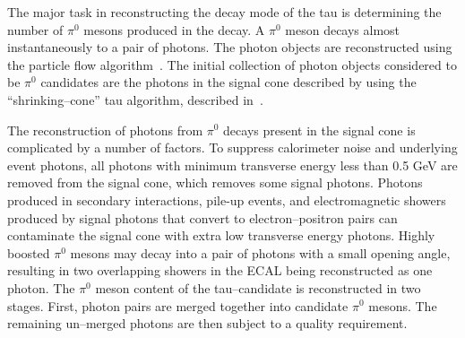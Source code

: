 The major task in reconstructing the decay mode of the tau is determining the
number of $\pi^0$ mesons produced in the decay.  A $\pi^0$ meson decays almost
instantaneously to a pair of photons.  The photon objects are reconstructed using the
particle flow algorithm~\cite{PFT09}. The initial collection of
photon objects considered to be $\pi^0$ candidates are the photons in the signal
cone described by using the ``shrinking--cone'' tau algorithm, described
in~\cite{PFT08001}.  

The reconstruction of photons from $\pi^0$ decays present in the signal cone is
complicated by a number of factors.  To suppress calorimeter noise and underlying
event photons, all photons with minimum transverse energy less than 0.5 GeV are
removed from the signal cone, which removes some signal photons.  Photons
produced in secondary interactions, pile-up events, and electromagnetic showers
produced by signal photons that convert to electron--positron pairs can
contaminate the signal cone with extra low transverse energy photons.  Highly
boosted $\pi^0$ mesons may decay into a pair of photons with a small opening
angle, resulting in two overlapping showers in the ECAL being reconstructed as
one photon.  The $\pi^0$ meson content of the tau--candidate is reconstructed in
two stages.  First, photon pairs are merged together into candidate $\pi^0$
mesons.  The remaining un--merged photons are then subject to a quality
requirement.
